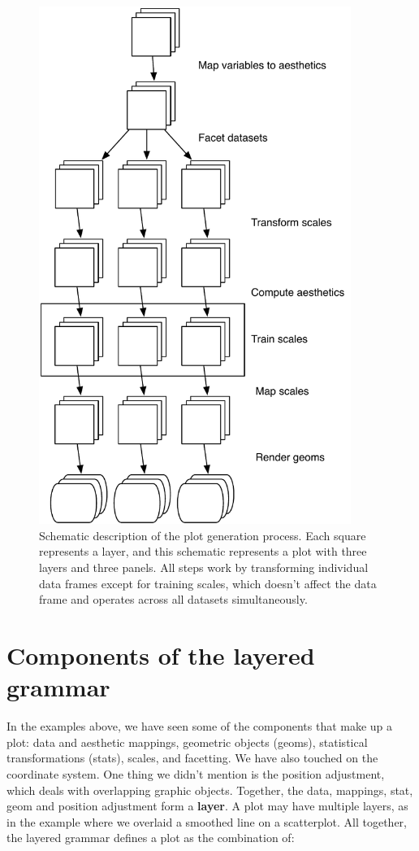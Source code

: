 \begin{figure}[htbp]
  \centering
  \includegraphics[width=4in]{diagrams/mastery-schema}
  \caption{Schematic description of the plot generation process. Each square represents a layer, and this schematic represents a plot with three layers and three panels. All steps work by transforming individual data frames except for training scales, which doesn't affect the data frame and operates across all datasets simultaneously.}
  \label{fig:schematic}
\end{figure}

\hypertarget{sec:components}{\section{Components of the layered
grammar}\label{sec:components}}

In the examples above, we have seen some of the components that make up
a plot: data and aesthetic mappings, geometric objects (geoms),
statistical transformations (stats), scales, and facetting. We have also
touched on the coordinate system. One thing we didn't mention is the
position adjustment, which deals with overlapping graphic objects.
Together, the data, mappings, stat, geom and position adjustment form a
\textbf{layer}. A plot may have multiple layers, as in the example where
we overlaid a smoothed line on a scatterplot. All together, the layered
grammar defines a plot as the combination of: 

